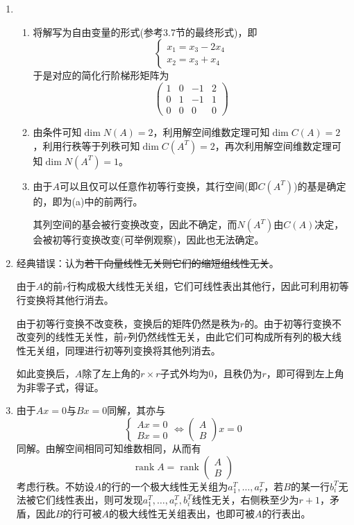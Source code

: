 \documentclass[a4paper,UTF8,fontset=windows]{ctexart}
\DeclareMathOperator{\rank}{rank}
\newcommand*{\note}{\noindent *}
\begin{document}
\begin{enumerate}
    \item
    \begin{enumerate}
        \item 将解写为自由变量的形式(参考3.7节的最终形式)，即
        $$\begin{cases}x_1=x_3-2x_4\\x_2=x_3+x_4\end{cases}$$
        于是对应的简化行阶梯形矩阵为
        $$\begin{pmatrix}1&0&-1&2\\0&1&-1&1\\0&0&0&0\end{pmatrix}$$
        \item 由条件可知$\dim N(A)=2$，利用解空间维数定理可知$\dim C(A)=2$，利用行秩等于列秩可知$\dim C(A^T)=2$，再次利用解空间维数定理可知$\dim N(A^T)=1$。
        \item 由于$A$可以且仅可以任意作初等行变换，其行空间(即$C(A^T)$)的基是确定的，即为(a)中的前两行。
        
        其列空间的基会被行变换改变，因此不确定，而$N(A^T)$由$C(A)$决定，会被初等行变换改变(可举例观察)，因此也无法确定。
    \end{enumerate}

    \item 
    \note 经典错误：认为\sout{若干向量线性无关则它们的缩短组线性无关}。

    由于$A$的前$r$行构成极大线性无关组，它们可线性表出其他行，因此可利用初等行变换将其他行消去。

    由于初等行变换不改变秩，变换后的矩阵仍然是秩为$r$的。由于初等行变换不改变列的线性无关性，前$r$列仍然线性无关，由此它们可构成所有列的极大线性无关组，同理进行初等列变换将其他列消去。

    如此变换后，$A$除了左上角的$r\times r$子式外均为0，且秩仍为$r$，即可得到左上角为非零子式，得证。

    \item 由于$Ax=0$与$Bx=0$同解，其亦与
    $$\begin{cases}Ax=0\\Bx=0\end{cases}\Longleftrightarrow\begin{pmatrix}A\\B\end{pmatrix}x=0$$
    同解。由解空间相同可知维数相同，从而有
    $$\rank A=\rank\begin{pmatrix}A\\B\end{pmatrix}$$
    考虑行秩。不妨设$A$的行的一个极大线性无关组为$a_1^T,\dots,a_r^T$，若$B$的某一行$b_i^T$无法被它们线性表出，则可发现$a_1^T,\dots,a_r^T,b_i^T$线性无关，右侧秩至少为$r+1$，矛盾，因此$B$的行可被$A$的极大线性无关组表出，也即可被$A$的行表出。


\end{enumerate}
\end{document}
